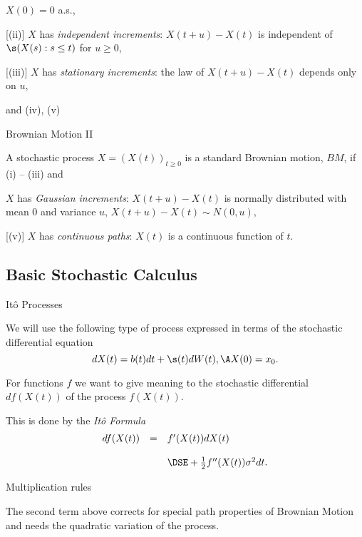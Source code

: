 	$X(0) = 0$ a.s.,

	[(ii)] $X$ has {\it independent
increments}: $X(t+u) - X(t)$ is independent of $\s (X(s): s \leq
t)$ for $u \geq 0$,

	[(iii)]  $X$ has {\it stationary
increments}: the law of $X(t+u) - X(t)$ depends only on $u$,




and (iv), (v)

{Brownian Motion II}

A stochastic process $X=(X(t))_{t \geq 0}$ is a standard
Brownian motion, $BM$, if (i) -- (iii) and






	$X$ has {\it Gaussian increments}: $X(t+u) - X(t)$ is
normally distributed with mean $0$ and variance $u$, $X(t+u) -
X(t) \sim N(0,u)$,

	[(v)]  $X$ has {\it continuous paths}:
$X(t)$ is a continuous function of $t$.





\subsection{Basic Stochastic Calculus}

{ It{\^o} Processes}






	We will use the following type of process expressed
in terms of the stochastic differential equation
$$
dX(t) = b(t) dt + \s(t) dW(t), \A X(0) = x_0.
$$


	For functions $f$ we want to give  meaning to the stochastic differential
$df(X(t))$ of the process $f(X(t))$.


	This is done by the {\it It{\^o} Formula}
$$
\begin{array}{lll}
df(X(t)) &=& f'(X(t)) dX(t)\\*[12pt]
&& \DSE+ \frac{1}{2} f''(X(t)) \sigma^2 dt.
\end{array}
$$





{Multiplication rules}






	The second term above corrects for special path properties of
Brownian Motion and needs the quadratic variation of the process.


